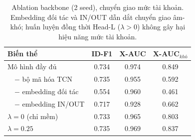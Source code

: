 \documentclass[conference]{IEEEtran}
\begin{document}
\begin{table}[t]\centering\caption{\textbf{Giá trị biên của attention} trong hợp nhất nhận-biết-nội-dung SOTA (cùng giao thức LOO, $n{=}101$). Riêng đặc trưng thủ công đã đạt Hit@1 0.792--0.832; thêm attention mạnh không thắng hợp nhất không-attention (paired $p{=}0.68$). Attention hữu ích nhưng không thiết yếu.}\label{tab:attn}
\end{table}

\begin{table}[t]\centering\caption{Ablation backbone (2 seed), chuyển giao mức tài
khoản. Embedding đối tác và IN/OUT dẫn dắt chuyển giao âm-khó; huấn luyện đồng thời
Head-L ($\lambda{>}0$) không gây hại hiệu năng mức tài khoản.}\label{tab:abl}
\begin{tabular}{lccc}\toprule
\textbf{Biến thể} & \textbf{ID-F1} & \textbf{X-AUC} & \textbf{X-AUC$_{khó}$} \\\midrule
Mô hình đầy đủ & 0.734 & 0.974 & 0.849 \\
\ \ $-$ bộ mã hóa TCN & 0.735 & 0.955 & 0.592 \\
\ \ $-$ embedding đối tác & 0.554 & 0.960 & 0.461 \\
\ \ $-$ embedding IN/OUT & 0.717 & 0.928 & 0.662 \\
$\lambda{=}0$ (chỉ mềm) & 0.733 & 0.965 & 0.803 \\
$\lambda{=}0.25$ & 0.735 & 0.969 & 0.837 \\
\bottomrule\end{tabular}\end{table}
\end{document}
